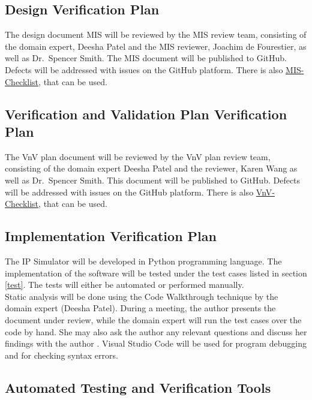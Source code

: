 \documentclass[12pt, titlepage]{article}
\begin{document}
\subsection{Design Verification Plan}

The design document MIS will be reviewed by the MIS review team, consisting of the domain expert, Deesha Patel and the MIS reviewer, Joachim de Fourestier, as well as Dr.\ Spencer Smith.
The MIS document will be published to GitHub. Defects will be addressed with issues on the GitHub platform. There is also \href{https://github.com/smiths/capTemplate/blob/main/docs/Checklists/MIS-Checklist.pdf}{MIS-Checklist}, that can be used.

\subsection{Verification and Validation Plan Verification Plan}
The VnV plan document will be reviewed by the VnV plan review team, consisting of the domain expert Deesha Patel and the reviewer, Karen Wang as well as Dr.\ Spencer Smith.
This document will be published to GitHub. Defects will be addressed with issues on the GitHub platform.
There is also \href{https://github.com/smiths/capTemplate/blob/main/docs/Checklists/VnV-Checklist.pdf}{VnV-Checklist}, that can be used.

\subsection{Implementation Verification Plan}

The IP Simulator will be developed in Python programming language. The implementation of the software will be tested under the test cases listed in section \ref{test}. The tests will either be automated or performed manually. \\
Static analysis will be done using the Code Walkthrough technique by the domain expert (Deesha Patel). During a meeting, the author presents the document under review, while the domain expert will run the test cases over the code by hand. She may also ask the author any relevant questions and discuss her findings with the author \cite{codeWalkThrough}. Visual Studio Code will be used for program debugging and for checking syntax errors. \\
 
\subsection{Automated Testing and Verification Tools}
\end{document}
